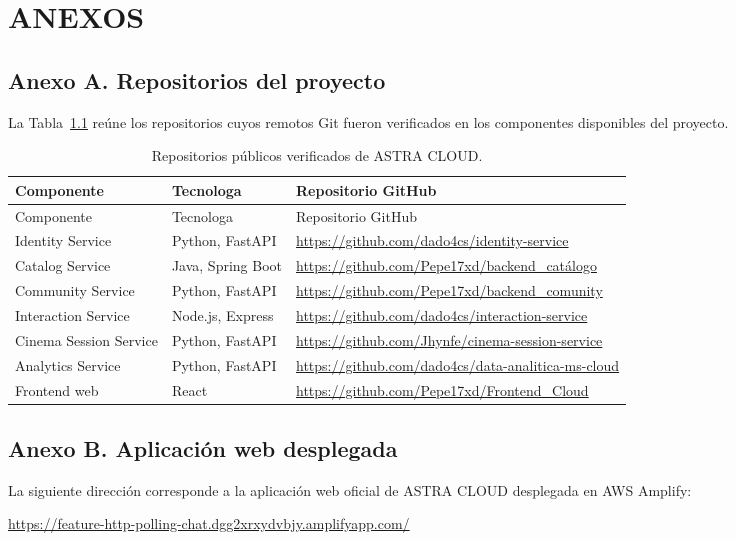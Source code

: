 ﻿\chapter{ANEXOS}
\section{Anexo A. Repositorios del proyecto}
La Tabla~\ref{tab:repositorios-astra} reúne los repositorios cuyos remotos Git fueron verificados en los componentes disponibles del proyecto.

\begin{longtable}{p{}p{}p{}}
\caption{Repositorios públicos verificados de ASTRA CLOUD.}\label{tab:repositorios-astra}\\
\toprule
Componente & Tecnologa & Repositorio GitHub \\
\midrule
\endfirsthead
\toprule
Componente & Tecnologa & Repositorio GitHub \\
\midrule
\endhead
Identity Service & Python, FastAPI & \url{https://github.com/dado4cs/identity-service} \\
Catalog Service & Java, Spring Boot & \url{https://github.com/Pepe17xd/backend_catálogo} \\
Community Service & Python, FastAPI & \url{https://github.com/Pepe17xd/backend_comunity} \\
Interaction Service & Node.js, Express & \url{https://github.com/dado4cs/interaction-service} \\
Cinema Session Service & Python, FastAPI & \url{https://github.com/Jhynfe/cinema-session-service} \\
Analytics Service & Python, FastAPI & \url{https://github.com/dado4cs/data-analitica-ms-cloud} \\
Frontend web & React & \url{https://github.com/Pepe17xd/Frontend_Cloud} \\
\bottomrule
\end{longtable}

\section{Anexo B. Aplicación web desplegada}
La siguiente dirección corresponde a la aplicación web oficial de ASTRA CLOUD desplegada en AWS Amplify:

\noindent\url{https://feature-http-polling-chat.dgg2xrxydvbjy.amplifyapp.com/}
